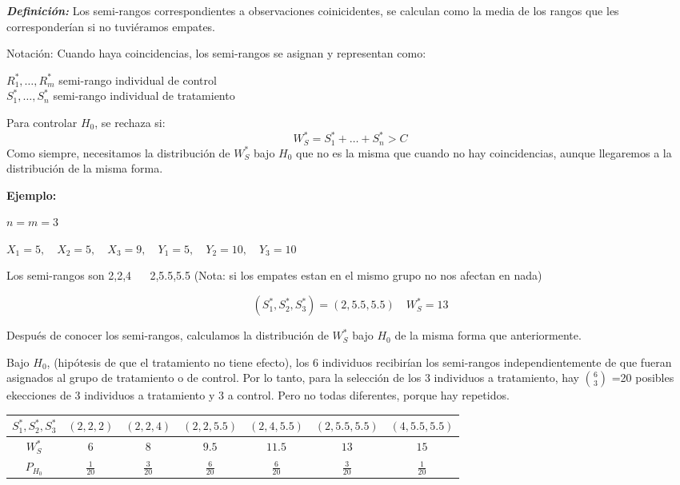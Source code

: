\textbf{\textit{Definición: }}Los semi-rangos correspondientes a observaciones coinicidentes, se calculan como la media de los rangos que les corresponderían si no tuviéramos empates.

Notación:
Cuando haya coincidencias, los semi-rangos se asignan y representan como:
\begin{center}
$R_1^*,\dots,R_m^*$ semi-rango individual de control \\
$S_1^*,\dots,S_n^*$ semi-rango individual de tratamiento
\end{center}

Para controlar $H_0$, se rechaza si:
\[
    W_S^*=S_1^*+\dots+S_n^*>C
\]
Como siempre, necesitamos la distribución de $W_S^*$ bajo $H_0$ que no es la misma que cuando no hay coincidencias, aunque llegaremos a la distribución de la misma forma.

\noindent \textbf{Ejemplo:}

$n=m=3$

\(
X_1=5, \quad X_2=5, \quad X_3=9, \quad Y_1=5,\quad Y_2=10,\quad Y_3=10
\)

Los semi-rangos son 2,2,4 $\quad$ 2,5.5,5.5
(Nota: si los empates estan en el mismo grupo no nos afectan en nada)

\[
(S_1^*,S_2^*,S_3^*)=(2,5.5,5.5) \quad W_S^*=13
\]

Después de conocer los semi-rangos, calculamos la distribución de $W_S^*$ bajo $H_0$ de la misma forma que anteriormente.

Bajo $H_0$, (hipótesis de que el tratamiento no tiene efecto), los 6 individuos recibirían los semi-rangos independientemente de que fueran asignados al grupo de tratamiento o de control. Por lo tanto, para la selección de los 3 individuos a tratamiento, hay $\binom{6}{3}$
=20 posibles ekecciones de 3 individuos a tratamiento y 3 a control. Pero no todas diferentes, porque hay repetidos.

\begin{table}[h!]
    \centering
    \begin{tabular}{c|c|c|c|c|c|c}
    $S_1^*,S_2^*,S_3^*$ & $(2,2,2)$ & $(2,2,4)$ & $(2,2,5.5)$ & $(2,4,5.5)$ & $(2,5.5,5.5)$ & $(4,5.5,5.5)$ \\ \hline
    $W_S^*$             & $6$       & $8$       & $9.5$       & $11.5$      & $13$          & $15$          \\ \hline
    $P_{H_0}$           & $\frac{1}{20}$ & $\frac{3}{20}$ & $\frac{6}{20}$ & $\frac{6}{20}$ & $\frac{3}{20}$ & $\frac{1}{20}$
    \end{tabular}
\end{table}

